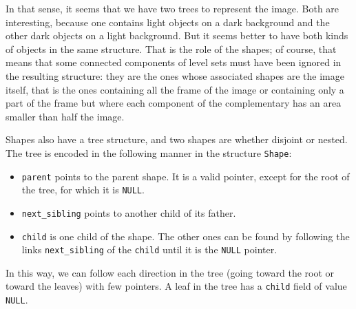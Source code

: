In that sense, it seems that we
have two trees to represent the image. Both are interesting, because one
contains light objects on a dark background and the other dark objects on
a light background. But it seems better to have both kinds of objects in
the same structure. That is the role of the shapes; of course, that means that
some connected components of level sets must have been ignored in the
resulting structure: they are the ones whose associated shapes are the image
itself, that is the ones containing all the frame of the image or containing
only a part of the frame but where each component of the complementary has
an area smaller than half the image.

Shapes also have a tree structure, and two shapes are whether disjoint or
nested. The tree is encoded in the following manner in the structure
\texttt{Shape}:
\begin{itemize}
\item \texttt{parent} points to the parent shape. It is a valid pointer,
except for the root of the tree, for which it is \texttt{NULL}.
\item \texttt{next\_sibling} points to another child of its father.
\item \texttt{child} is one child of the shape. The other ones can be found
by following the links \texttt{next\_sibling} of the \texttt{child} until it is
the \texttt{NULL} pointer.
\end{itemize}
In this way, we can follow each direction in the tree (going toward the
root or toward the leaves) with few pointers. A leaf in the tree has a
\texttt{child} field of value \texttt{NULL}.

